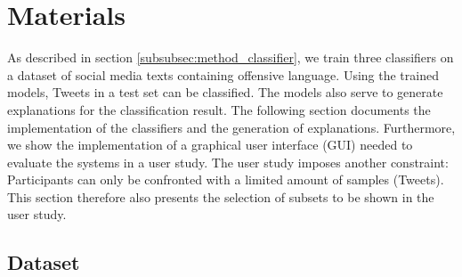 \section{Materials}
As described in section \ref{subsubsec:method_classifier}, we train three classifiers on a dataset of social media texts containing offensive language. Using the trained models, Tweets in a test set can be classified. The models also serve to generate explanations for the classification result. The following section documents the implementation of the classifiers and the generation of explanations. Furthermore, we show the implementation of a graphical user interface (GUI) needed to evaluate the systems in a user study. The user study imposes another constraint: Participants can only be confronted with a limited amount of samples (Tweets). This section therefore also presents the selection of subsets to be shown in the user study.


\subsection{Dataset}

